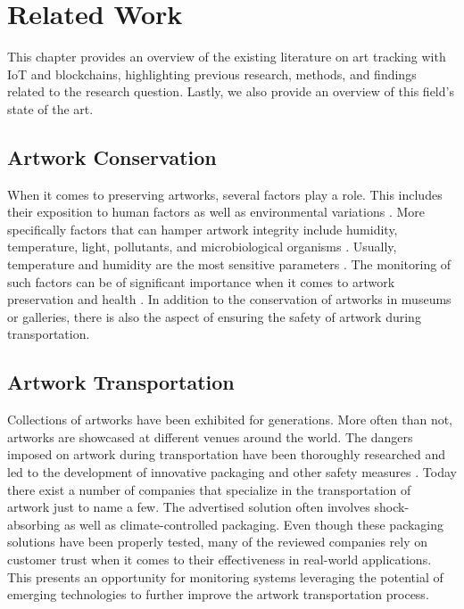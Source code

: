 \chapter{Related Work}
\label{chap:related_work}
This chapter provides an overview of the existing literature on art tracking with IoT and blockchains, highlighting previous research, methods, and findings related to the research question. Lastly, we also provide an overview of this field's state of the art.

\section{Artwork Conservation}
When it comes to preserving artworks, several factors play a role. This includes their exposition to human factors as well as environmental variations \cite{woodenartworkmonitoring}. More specifically factors that can hamper artwork integrity include humidity, temperature, light, pollutants, and microbiological organisms \cite{riskassessment}. Usually, temperature and humidity are the most sensitive parameters \cite{riskassessment}. The monitoring of such factors can be of significant importance when it comes to artwork preservation and health \cite{environmentmonitoring}. In addition to the conservation of artworks in museums or galleries, there is also the aspect of ensuring the safety of artwork during transportation. 

\section{Artwork Transportation}
Collections of artworks have been exhibited for generations. More often than not, artworks are showcased at different venues around the world. The dangers imposed on artwork during transportation have been thoroughly researched and led to the development of innovative packaging and other safety measures \cite{artintransit}. Today there exist a number of companies that specialize in the transportation of artwork \cite{kraftels, hasenkamp, weltifurrer} just to name a few. The advertised solution often involves shock-absorbing as well as climate-controlled packaging. Even though these packaging solutions have been properly tested, many of the reviewed companies rely on customer trust when it comes to their effectiveness in real-world applications. This presents an opportunity for monitoring systems leveraging the potential of emerging technologies to further improve the artwork transportation process.

